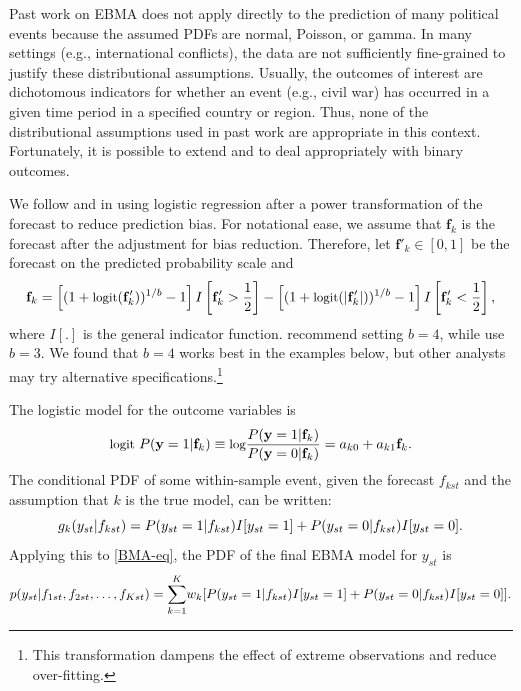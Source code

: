 \documentclass[pdftex,12pt,fullpage,oneside]{amsart}
\begin{document}
Past work on EBMA does not apply directly to the prediction of many
political events because the assumed PDFs are normal, Poisson, or
gamma. In many  settings (e.g., international conflicts), the data
are not sufficiently fine-grained to justify these distributional
assumptions.  Usually, the outcomes of interest are dichotomous
indicators for whether an event (e.g., civil war) has occurred in a
given time period in a specified country or region. Thus, none of the
distributional assumptions used in past work are appropriate in this
context.  Fortunately, it is possible to extend \citet{Sloughter:2007}
and \citet{Sloughter:2010} to deal appropriately with binary outcomes.

We follow \citet{Sloughter:2007} and \citet{Hamill:2004} in using
logistic regression after a power transformation of the forecast to
reduce prediction bias. For notational ease, we assume that $\mathbf{f}_k$ is the
forecast after the adjustment for bias reduction.  Therefore, let
$\mathbf{f}'_k \in [0,1]$ be the forecast on the predicted probability scale
 and
\begin{equation}
\small
\mathbf{f}_k =  \left[(1+\mbox{logit}(\mathbf{f}'_k))^{1/b} - 1\right]I\left[\mathbf{f}'_k>\frac{1}{2}\right]  - \left[(1+\mbox{logit}(|\mathbf{f}'_k|))^{1/b} -  1\right]I\left[\mathbf{f}'_k<\frac{1}{2}\right],
 \end{equation}
 \noindent where $I[.]$ is the general indicator function.
 \citet{Hamill:2004} recommend setting $b=4$, while
 \citet{Sloughter:2007} use $b=3$.  We found that $b=4$ works best in
 the examples below, but other analysts may try alternative
 specifications.\footnote{This transformation dampens the effect of
   extreme observations and reduce over-fitting.}

The logistic model for the outcome variables is %
\begin{equation} \small
\label{one}
\mbox{logit } P(\mathbf{y}=1|\mathbf{f}_k) \equiv \mbox{log}\frac{P(\mathbf{y}=1|\mathbf{f}_k)}{P(\mathbf{y}=0|\mathbf{f}_k)} = a_{k0}+a_{k1}\mathbf{f}_k .
\end{equation}
\noindent The conditional PDF of some within-sample event, given the
forecast $f_{kst}$ and the assumption that $k$ is the true model, can
be written:
\begin{equation} 
\label{component-eq}
\small
g_k(y_{st}|f_{kst}) = P(y_{st}=1|f_{kst})I[y_{st}=1]  + P(y_{st}=0|f_{kst})I[y_{st}=0].
\end{equation}
Applying this to \eqref{BMA-eq}, the PDF of the final EBMA model for
$y_{st}$ is
 \begin{equation}
 \label{pdf}
 \small
 p(y_{st}|f_{1st}, f_{2st}, \ldots, f_{Kst}) =  \overset{K}{\underset{k=1}{\sum}} w_k [ P(y_{st}=1|f_{kst})I[y_{st}=1]  + P(y_{st}=0|f_{kst})I[y_{st}=0]].
 \end{equation}
\end{document}
